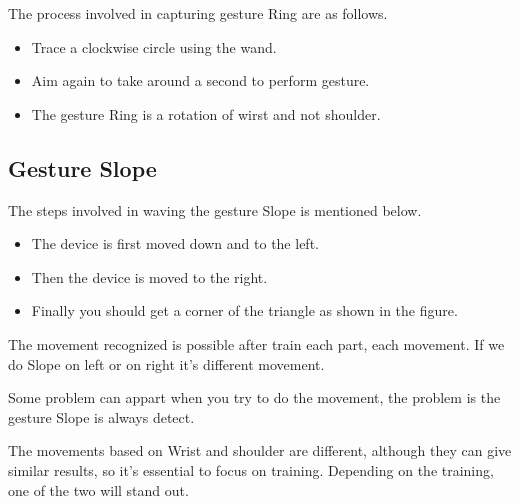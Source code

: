 The process involved in capturing gesture Ring are as follows.

\begin{itemize}
    \item Trace a clockwise circle using the wand.
    \item Aim again to take around a second to perform gesture.	
    \item The gesture Ring is a rotation of wirst and not shoulder.
\end{itemize}


\subsection{Gesture Slope}

\begin{center}	
    
    
\end{center}
The steps involved in waving the gesture Slope  is mentioned below.
\begin{itemize}
    
    \item The device is first moved down and to the left.
    \item Then the device is moved to the right.
    \item Finally you should get a corner of the triangle as shown in the figure.
    
\end{itemize}

The movement recognized is possible after train each part, each movement. If we do Slope on left or on right it's different movement.

Some problem can appart when you try to do the movement, the problem  is the gesture Slope is always detect. 

The movements based on Wrist and shoulder are different, although they can give similar results, so it's essential to focus on training. Depending on the training, one of the two will stand out. 



